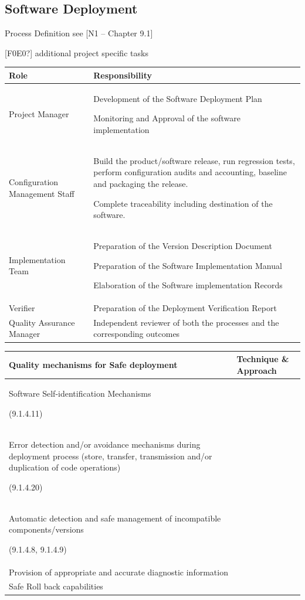 \documentclass{template/openetcs_article}
\begin{document}
\subsection{Software Deployment}
Process Definition see [N1 -- Chapter 9.1]

[F0E0?] additional project specific tasks

\begin{flushleft}
\tablefirsthead{}
\tablehead{}
\tabletail{}
\tablelasttail{}
\begin{supertabular}{|m{5cm}|m{9cm}|}
\hline
Role &
Responsibility\\\hline
Project Manager &
Development of the Software Deployment Plan

Monitoring and Approval of the software implementation\\\hline
Configuration Management Staff &
Build the product/software release, run regression tests, perform configuration audits and accounting, baseline and packaging the release.

Complete traceability including destination of the software.\\\hline
Implementation Team &
Preparation of the Version Description Document

Preparation of the Software Implementation Manual

Elaboration of the Software implementation Records\\\hline
Verifier &
Preparation of the Deployment Verification Report\\\hline
Quality Assurance Manager &
Independent reviewer of both the processes and the corresponding outcomes\\\hline
\end{supertabular}
\end{flushleft}



\begin{flushleft}
\tablefirsthead{}
\tablehead{}
\tabletail{}
\tablelasttail{}
\begin{supertabular}{|m{7cm}|m{7cm}|}
\hline
Quality mechanisms for Safe deployment &
Technique \& Approach\\\hline
Software Self-identification Mechanisms

(9.1.4.11) &
~
\\\hline
Error detection and/or avoidance mechanisms during deployment process (store, transfer, transmission and/or duplication of code operations)

(9.1.4.20) &
~
\\\hline
Automatic detection and safe management of incompatible components/versions

(9.1.4.8, 9.1.4.9) &
~
\\\hline
Provision of appropriate and accurate diagnostic information &
~
\\\hline
Safe Roll back capabilities  &
~
\\\hline
\end{supertabular}
\end{flushleft}
\end{document}
